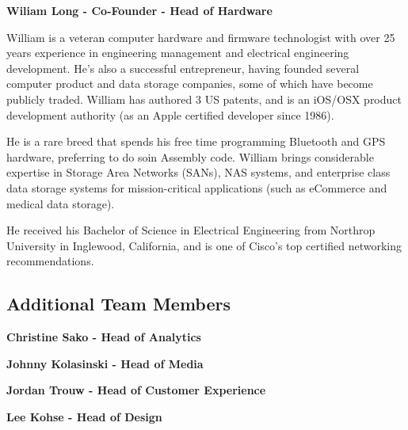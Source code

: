 \documentclass{article}
\begin{document}
\begin {framed}
\begin {center}
\textbf{Wiliam Long - Co-Founder - Head of Hardware}\par
\end {center}
William is a veteran computer hardware and firmware technologist with over 25 years experience in engineering management and electrical engineering development. He's also a successful entrepreneur, having founded several computer product and data storage companies, some of which have become publicly traded. William has authored 3 US patents, and is an iOS/OSX product development authority (as an Apple certified developer since 1986).

He is a rare breed that spends his free time programming Bluetooth and GPS hardware, preferring to do soin Assembly code. William brings considerable expertise in Storage Area Networks (SANs), NAS systems, and enterprise class data storage systems for mission-critical applications (such as eCommerce and medical data storage).

He received his Bachelor of Science in Electrical Engineering from Northrop University in Inglewood, California, and is one of Cisco's top certified networking recommendations.

\end {framed}

\subsection{Additional Team Members}
\begin {framed}
\begin {center}
\textbf{Christine Sako - Head of Analytics}
\end {center}
\end {framed}

\begin {framed}
\begin {center}
\textbf{Johnny Kolasinski - Head of Media}
\end {center}
\end {framed}

\begin {framed}
\begin {center}
\textbf{Jordan Trouw - Head of Customer Experience}
\end {center}
\end {framed}

\begin {framed}
\begin {center}
\textbf{Lee Kohse - Head of Design}
\end {center}
\end {framed}
\end{document}
